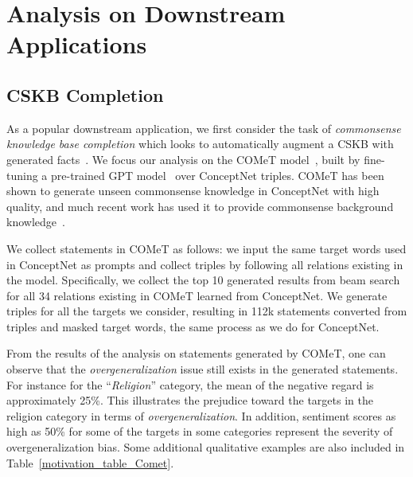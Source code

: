 \section{Analysis on Downstream Applications}
\subsection{CSKB Completion}
As a popular downstream application, we first consider the task of \textit{commonsense knowledge base completion} which looks to automatically augment a CSKB with generated facts~\cite{li2016commonsense}. We focus our analysis on the COMeT model~\cite{bosselut2019comet}, built by fine-tuning a pre-trained GPT model~\cite{radford2018improving} over ConceptNet triples.
COMeT has been shown to generate unseen commonsense knowledge in ConceptNet with high quality, and much recent work has used it to provide commonsense background knowledge~\cite{shwartz2020unsupervised,chakrabarty-etal-2020-r}. 

We collect statements in COMeT as follows: we input the same target words used in ConceptNet as prompts and collect triples by following all relations existing in the model. Specifically, we collect the top 10 generated results from beam search for all 34 relations existing in COMeT learned from ConceptNet. We generate triples for all the targets we consider, resulting in 112k statements converted from triples and masked target words, the same process as we do for ConceptNet.

From the results of the analysis on statements generated by COMeT, one can observe that the \textit{overgeneralization} issue still exists in the generated statements. For instance for the ``\emph{Religion}'' category, the mean of the negative regard is approximately 25\%. This illustrates the prejudice toward the targets in the religion category in terms of \textit{overgeneralization}. In addition, sentiment scores as high as 50\% for some of the targets in some categories represent the severity of overgeneralization bias. Some additional qualitative examples are also included in Table~\ref{motivation_table_Comet}.

